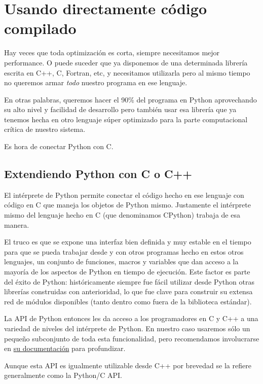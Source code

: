 \section{Usando directamente código compilado}

Hay veces que toda optimización es corta, siempre necesitamos mejor performance. O puede suceder que ya disponemos de una determinada librería escrita en C++, C, Fortran, etc, y necesitamos utilizarla pero al mismo tiempo no queremos armar \textit{todo} nuestro programa en ese lenguaje. 

En otras palabras, queremos hacer el 90\% del programa en Python aprovechando su alto nivel y facilidad de desarrollo pero también usar esa librería que ya tenemos hecha en otro lenguaje súper optimizado para la parte computacional crítica de nuestro sistema.

Es hora de conectar Python con C.


\subsection{Extendiendo Python con C o C++}

El intérprete de Python permite conectar el código hecho en ese lenguaje con código en C que maneja los objetos de Python mismo. Justamente el intérprete mismo del lenguaje hecho en C (que denominamos CPython) trabaja de esa manera. 

El truco es que se expone una interfaz bien definida y muy estable en el tiempo para que se pueda trabajar desde y con otros programas hecho en estos otros lenguajes, un conjunto de funciones, macros y variables que dan acceso a la mayoría de los aspectos de Python en tiempo de ejecución. Este factor es parte del éxito de Python: históricamente siempre fue fácil utilizar desde Python otras librerías construidas con anterioridad, lo que fue clave para construir su extensa red de módulos disponibles (tanto dentro como fuera de la biblioteca estándar).

La API de Python entonces les da acceso a los programadores en C y C++ a una variedad de niveles del intérprete de Python. En nuestro caso usaremos sólo un pequeño subconjunto de toda esta funcionalidad, pero recomendamos involucrarse en \href{https://docs.python.org/es/dev/c-api/index.html}{su documentación} para profundizar.

\begin{info}
Aunque esta API es igualmente utilizable desde C++ por brevedad se la refiere generalmente como la Python/C API.
\end{info}

